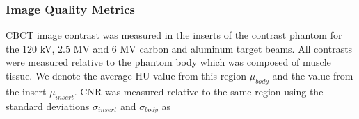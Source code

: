 

\subsubsection{Image Quality Metrics}


CBCT image contrast was measured in the inserts of the contrast phantom for the 120 kV, 2.5 MV and 6 MV carbon and aluminum target beams. All contrasts were measured relative to the phantom body which was composed of muscle tissue. We denote the average HU value from this region $\mu_{body}$ and the value from the insert $\mu_{insert}$. CNR was measured relative to the same region using the standard deviations $\sigma_{insert}$ and $\sigma_{body}$ as

